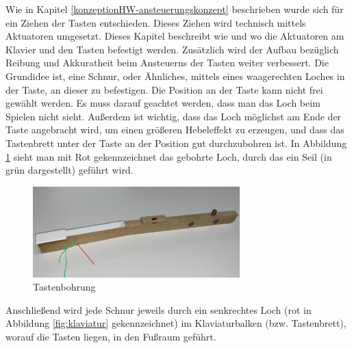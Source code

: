 Wie in Kapitel \ref{konzeptionHW-ansteuerungskonzept} beschrieben wurde sich für ein Ziehen der Tasten entschieden.
Dieses Ziehen wird technisch mittels Aktuatoren umgesetzt. \newline
Dieses Kapitel beschreibt wie und wo die Aktuatoren am Klavier und den Tasten befestigt werden. %
Zusätzlich wird der Aufbau bezüglich Reibung und Akkuratheit beim Ansteuerns der Tasten weiter verbessert. %
\newline
Die Grundidee ist, eine Schnur, oder Ähnliches, mittels eines waagerechten Loches in der Taste, an dieser zu befestigen. %
Die Position an der Taste kann nicht frei gewählt werden. Es muss darauf geachtet werden,
dass man das Loch beim Spielen nicht sieht. %
Außerdem ist wichtig, dass das Loch möglichst am Ende der Taste angebracht wird, um einen größeren Hebeleffekt zu erzeugen,
und dass das Tastenbrett unter der Taste an der Position gut durchzubohren ist.
In Abbildung \ref{img:Tastenbohrung} sieht man mit Rot gekennzeichnet das gebohrte Loch, durch das ein Seil (in grün dargestellt) geführt wird.

\begin{figure}[htbp]
	\centering
	\includegraphics[width=8cm]{img/Taste_schraeg.jpg}
	\caption{Tastenbohrung}
	\label{img:Tastenbohrung}
\end{figure}


Anschließend wird jede Schnur jeweils durch ein senkrechtes Loch (rot in Abbildung \ref{fig:klaviatur} gekennzeichnet) im Klaviaturbalken (bzw. Tastenbrett), %
worauf die Tasten liegen, in den Fußraum geführt.

